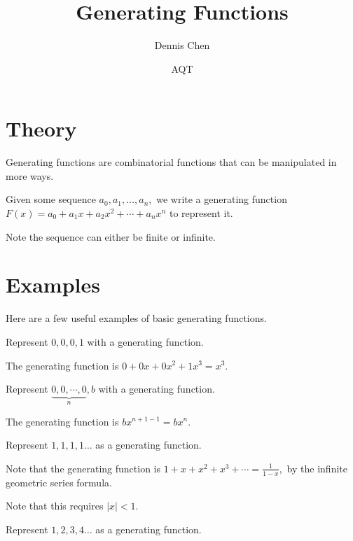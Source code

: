 \documentclass[mast]{lucky}
\title{Generating Functions}
\author{Dennis Chen}
\date{AQT}
\begin{document}
\maketitle

\section{Theory}
Generating functions are combinatorial functions that can be manipulated in more ways. 

\begin{theo}
Given some sequence $a_0,a_1,\dots,a_n,$ we write a generating function $F(x)=a_0+a_1x+a_2x^2+\cdots+a_nx^n$ to represent it.
\end{theo}
Note the sequence can either be finite or infinite.
\section{Examples}
Here are a few useful examples of basic generating functions.
\begin{exam}
Represent $0,0,0,1$ with a generating function.
\end{exam}

\begin{sol}
The generating function is $0+0x+0x^2+1x^3=x^3.$
\end{sol}

\begin{exam}
Represent $\underbrace{0,0,\cdots,0}_{n},b$ with a generating function.
\end{exam}

\begin{sol}
The generating function is $bx^{n+1-1}=bx^n.$
\end{sol}

\begin{exam}
Represent $1,1,1,1\dots$ as a generating function.
\end{exam}

\begin{sol}
Note that the generating function is $1+x+x^2+x^3+\cdots=\frac{1}{1-x},$ by the infinite geometric series formula.
\end{sol}
Note that this requires $|x|<1.$

\begin{exam}
Represent $1,2,3,4\dots$ as a generating function.
\end{exam}
\end{document}
